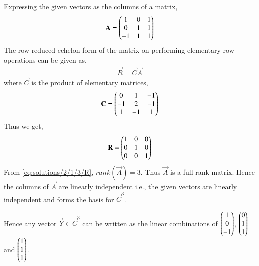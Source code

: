 Expressing the given vectors as the columns of a matrix,
\begin{align}
    \mathbf{A} = \begin{pmatrix}1&0&1\\0&1&1\\-1&1&1\end{pmatrix}
\end{align}
The row reduced echelon form of the matrix on performing elementary row operations can be given as, 
\begin{align}
    \vec{R} = \vec{C}\vec{A}
\end{align}
where $\vec{C}$ is the product of elementary matrices,
\begin{align}
    \mathbf{C} = \begin{pmatrix}0&1&-1\\-1&2&-1\\1&-1&1\end{pmatrix}
\end{align}
Thus we get,  
\begin{align}
    \mathbf{R} = \begin{pmatrix}1&0&0\\0&1&0\\0&0&1\end{pmatrix} \label{eq:solutions/2/1/3/R}
\end{align}
From \eqref{eq:solutions/2/1/3/R}, $rank(\vec{A})=3$. Thus $\vec{A}$ is a full rank matrix. Hence the columns of $\vec{A}$ are linearly independent i.e., the given vectors are linearly independent and forms the basis for $\vec{C}^3$.

Hence any vector $\vec{Y}\in\vec{C}^3$ can be written as the linear combinations of $\begin{pmatrix}1\\0\\-1\end{pmatrix}$, $\begin{pmatrix}0\\1\\1\end{pmatrix}$ and $\begin{pmatrix}1\\1\\1\end{pmatrix}$.


